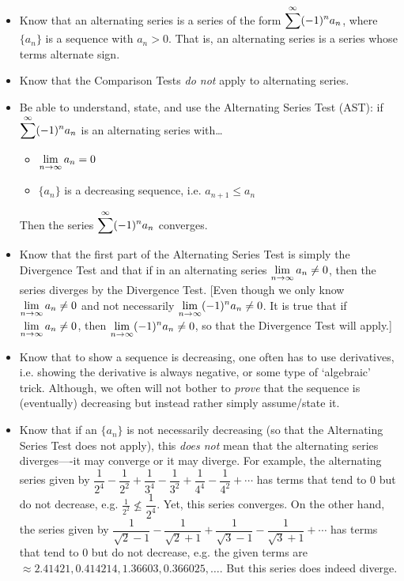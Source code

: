 \documentclass[11pt,letterpaper]{article}
\begin{document}
\begin{itemize}
\item Know that an alternating series is a series of the form $\displaystyle\sum^\infty (-1)^n a_n$, where $\{ a_n \}$ is a sequence with $a_n > 0$. That is, an alternating series is a series whose terms alternate sign. 

\item Know that the Comparison Tests \textit{do not} apply to alternating series.

\item Be able to understand, state, and use the Alternating Series Test (AST): if $\displaystyle\sum^\infty (-1)^n a_n$ is an alternating series with\dots
	\begin{itemize}
	\item $\displaystyle\lim_{n \to \infty} a_n= 0$
	\item $\{ a_n \}$ is a decreasing sequence, i.e. $a_{n+1} \leq a_n$
	\end{itemize}
Then the series $\displaystyle\sum^\infty (-1)^n a_n$ converges.

\item Know that the first part of the Alternating Series Test is simply the Divergence Test and that if in an alternating series $\displaystyle\lim_{n \to \infty} a_n \neq 0$, then the series diverges by the Divergence Test. [Even though we only know $\displaystyle\lim_{n \to \infty} a_n \neq 0$ and not necessarily $\displaystyle\displaystyle\lim_{n \to \infty} (-1)^n a_n \neq 0$. It is true that if $\displaystyle\lim_{n \to \infty} a_n \neq 0$, then $\displaystyle\lim_{n \to \infty} (-1)^n a_n \neq 0$, so that the Divergence Test will apply.]

\item Know that to show a sequence is decreasing, one often has to use derivatives, i.e. showing the derivative is always negative, or some type of `algebraic' trick. Although, we often will not bother to \textit{prove} that the sequence is (eventually) decreasing but instead rather simply assume/state it.

\item Know that if an $\{ a_n \}$ is not necessarily decreasing (so that the Alternating Series Test does not apply), this \textit{does not} mean that the alternating series diverges----it may converge or it may diverge. For example, the alternating series given by $\dfrac{1}{2^4} - \dfrac{1}{2^2} + \dfrac{1}{3^4} - \dfrac{1}{3^2} + \dfrac{1}{4^4} - \dfrac{1}{4^2} + \cdots$ has terms that tend to 0 but do not decrease, e.g. $\frac{1}{2^2} \not\leq \dfrac{1}{2^4}$. Yet, this series converges. On the other hand, the series given by $\dfrac{1}{\sqrt{2} - 1} - \dfrac{1}{\sqrt{2} + 1} + \dfrac{1}{\sqrt{3} - 1} - \dfrac{1}{\sqrt{3} + 1} + \cdots$ has terms that tend to 0 but do not decrease, e.g. the given terms are $\approx 2.41421, 0.414214, 1.36603, 0.366025, \ldots$. But this series does indeed diverge. 


\end{itemize}
\end{document}
